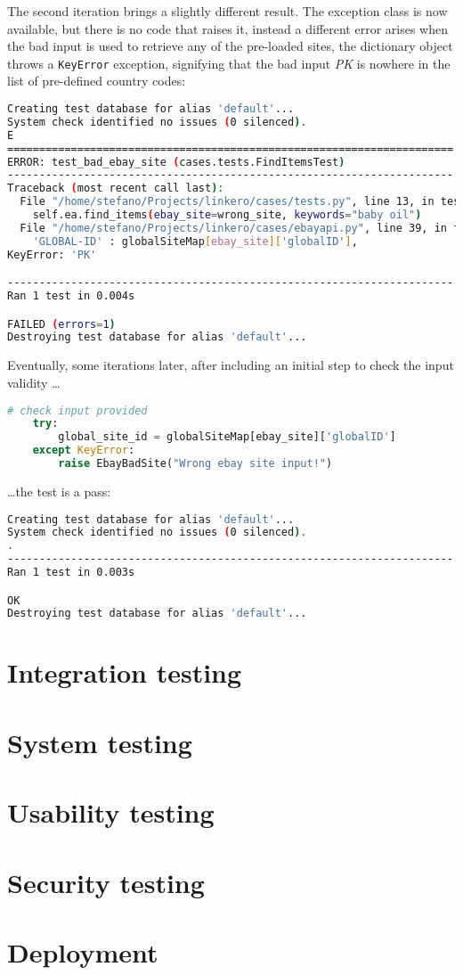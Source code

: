 The second iteration brings a slightly different result. The exception class is
now available, but there is no code that raises it, instead a different error
arises when the bad input is used to retrieve any of the pre-loaded sites, the
dictionary object throws a \texttt{KeyError} exception, signifying that the
bad input \emph{PK} is nowhere in the list of pre-defined country codes:
\begin{lstlisting}[language=bash, breaklines=true]
Creating test database for alias 'default'...
System check identified no issues (0 silenced).
E
======================================================================
ERROR: test_bad_ebay_site (cases.tests.FindItemsTest)
----------------------------------------------------------------------
Traceback (most recent call last):
  File "/home/stefano/Projects/linkero/cases/tests.py", line 13, in test_bad_ebay_site
    self.ea.find_items(ebay_site=wrong_site, keywords="baby oil")
  File "/home/stefano/Projects/linkero/cases/ebayapi.py", line 39, in find_items
    'GLOBAL-ID' : globalSiteMap[ebay_site]['globalID'],
KeyError: 'PK'

----------------------------------------------------------------------
Ran 1 test in 0.004s

FAILED (errors=1)
Destroying test database for alias 'default'...
\end{lstlisting}

Eventually, some iterations later, after including an initial step to check the
input validity \ldots
\begin{lstlisting}[language=Python, breaklines=true]
    # check input provided
    try:
        global_site_id = globalSiteMap[ebay_site]['globalID']
    except KeyError:
        raise EbayBadSite("Wrong ebay site input!")
\end{lstlisting}

\ldots the test is a pass:
\begin{lstlisting}[language=bash, breaklines=true]
Creating test database for alias 'default'...
System check identified no issues (0 silenced).
.
----------------------------------------------------------------------
Ran 1 test in 0.003s

OK
Destroying test database for alias 'default'...
\end{lstlisting}

\section{Integration testing}

\section{System testing}

\section{Usability testing}

\section{Security testing}

\section{Deployment}
